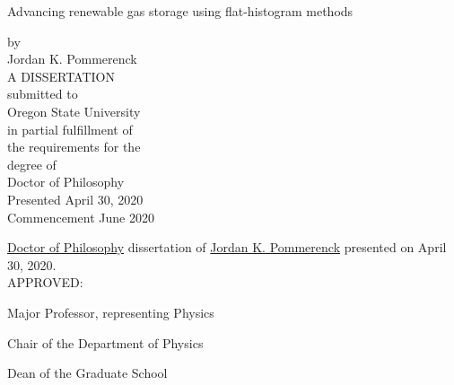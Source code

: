 \begin{center}
Advancing renewable gas storage using flat-histogram methods

\vspace{1.0cm}
by \\
Jordan K. Pommerenck \\
\vspace{3.0cm}
A DISSERTATION \\
\vspace{0.5cm}
submitted to \\
\vspace{0.5cm}
Oregon State University \\
\vspace{3.0cm}
in partial fulfillment of \\
the requirements for the \\
degree of \\
\vspace{1.0cm}
Doctor of Philosophy \\
\vspace{3.0cm}
Presented April 30, 2020  \\
Commencement June 2020
\end{center}

\newpage{}
\thispagestyle{empty}
\singlespacing
\justify{}
\underline{Doctor of Philosophy} dissertation of \underline{Jordan K. Pommerenck} presented on
April 30, 2020. \\

\justify{}
\vspace{0.5cm}
APPROVED: \\

\justify{}
\underline{\hspace{15cm}}
\begin{flushleft}
Major Professor, representing Physics
\vspace{1.0cm}
\end{flushleft}

\justify{}
\underline{\hspace{15cm}}
\begin{flushleft}
Chair of the Department of Physics
\vspace{1.0cm}
\end{flushleft}

\justify{}
\underline{\hspace{15cm}}
\begin{flushleft}
Dean of the Graduate School
\vspace{1.0cm}
\end{flushleft}

